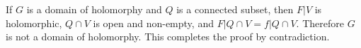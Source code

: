 If $G$ is a domain of holomorphy and $Q$ is a connected subset, then $F|V$ is holomorphic, $Q \cap V$ is open and non-empty, and $F|Q \cap V = f|Q \cap V$. Therefore $G$ is not a domain of holomorphy. This completes the proof by contradiction.
